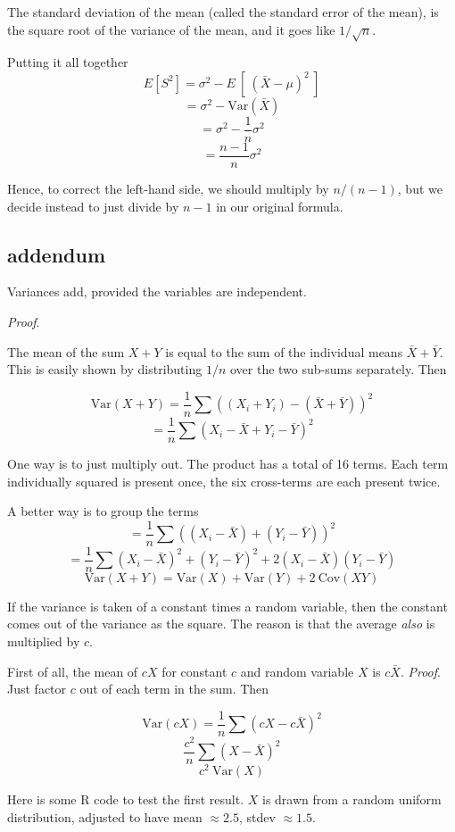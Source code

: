 \documentclass[11pt, oneside]{article}
\begin{document}
The standard deviation of the mean (called the standard error of the mean), is the square root of the variance of the mean, and it goes like $1/\sqrt{n}$.

Putting it all together
\[ E[S^2] = \sigma^2  - E \ [ \ (\bar{X} - \mu)^2 \ ]  \]
\[ = \sigma^2  - \text{Var}(\bar{X}) \]
\[ = \sigma^2 - \frac{1}{n} \sigma^2 \]
\[ = \frac{n-1}{n} \sigma^2 \]

Hence, to correct the left-hand side, we should multiply by $n/(n-1)$, but we decide instead to just divide by $n-1$ in our original formula.

\subsection*{addendum}

Variances add, provided the variables are independent.

\emph{Proof}.

The mean of the sum $X + Y$ is equal to the sum of the individual means $\bar{X} + \bar{Y}$.  This is easily shown by distributing $1/n$ over the two sub-sums separately.  Then

\[ \text{Var}(X + Y) = \frac{1}{n} \sum ((X_i + Y_i) - (\bar{X} + \bar{Y}) )^2 \]
\[ = \frac{1}{n} \sum (X_i - \bar{X}  + Y_i -  \bar{Y} )^2 \]

One way is to just multiply out.  The product has a total of 16 terms.  Each term individually squared is present once, the six cross-terms are each present twice.

A better way is to group the terms
\[ = \frac{1}{n} \sum ((X_i - \bar{X})  + (Y_i -  \bar{Y}))^2 \]
\[ = \frac{1}{n} \sum (X_i - \bar{X})^2 + (Y_i - \bar{Y})^2 + 2 (X_i  - \bar{X})(Y_i  - \bar{Y}) \]
\[ \text{Var}(X + Y) = \text{Var}(X) + \text{Var}(Y) + 2 \ \text{Cov}(XY) \] 

If the variance is taken of a constant times a random variable, then the constant comes out of the variance as the square.  The reason is that the average \emph{also} is multiplied by $c$.

First of all, the mean of $cX$ for constant $c$ and random variable $X$ is $c \bar{X}$.  \emph{Proof}.  Just factor $c$ out of each term in the sum.  Then

\[ \text{Var}(cX) = \frac{1}{n} \sum (cX - c\bar{X})^2 \]
\[ \frac{c^2}{n} \sum (X - \bar{X})^2 \]
\[ c^2 \ \text{Var}(X) \]

Here is some R code to test the first result.  $X$ is drawn from a random uniform distribution, adjusted to have mean $\approx 2.5$, stdev $\approx 1.5$.
\end{document}
